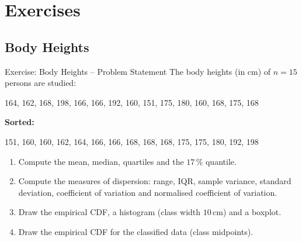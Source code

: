 \documentclass[aspectratio=169,11pt]{beamer}
\begin{document}
\section[Exercises]{Exercises}
\subsection{Body Heights}
\begin{frame}{Exercise: Body Heights -- Problem Statement}
  The body heights (in cm) of $n = 15$ persons are studied:
  \begin{center}
    164, 162, 168, 198, 166, 166, 192, 160, 151, 175, 180, 160, 168, 175, 168
  \end{center}
  \vspace{0.2cm}
  \textbf{Sorted:}
  \begin{center}
    151, 160, 160, 162, 164, 166, 166, 168, 168, 168, 175, 175, 180, 192, 198
  \end{center}
  \vspace{0.2cm}
  \begin{enumerate}
    \item Compute the mean, median, quartiles and the $17\,\%$ quantile.
    \item Compute the measures of dispersion: range, IQR, sample variance,
      standard deviation, coefficient of variation and normalised coefficient
      of variation.
    \item Draw the empirical CDF, a histogram (class width $10$\,cm)
      and a boxplot.
    \item Draw the empirical CDF for the classified data (class midpoints).
  \end{enumerate}
\end{frame}
\end{document}
